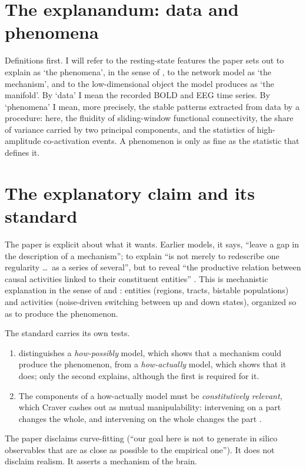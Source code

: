 \documentclass[11pt]{article}
\begin{document}
\section{The explanandum: data and phenomena}
Definitions first. I will refer to the resting-state features the paper sets out to explain as `the phenomena', in the sense of \textcite{bogen1988}, to the network model as `the mechanism', and to the low-dimensional object the model produces as `the manifold'. By `data' I mean the recorded BOLD and EEG time series. By `phenomena' I mean, more precisely, the stable patterns extracted from data by a procedure: here, the fluidity of sliding-window functional connectivity, the share of variance carried by two principal components, and the statistics of high-amplitude co-activation events. A phenomenon is only as fine as the statistic that defines it.


\section{The explanatory claim and its standard}
The paper is explicit about what it wants. Earlier models, it says, ``leave a gap in the description of a mechanism''; to explain ``is not merely to redescribe one regularity \ldots\ as a series of several'', but to reveal ``the productive relation between causal activities linked to their constituent entities'' \parencite[Introduction]{fousek2024}. This is mechanistic explanation in the sense of \textcite{mdc2000} and \textcite{craver2007}: entities (regions, tracts, bistable populations) and activities (noise-driven switching between up and down states), organized so as to produce the phenomenon.

The standard carries its own tests.
\begin{enumerate}
\item \textcite{craver2006} distinguishes a \emph{how-possibly} model, which shows that a mechanism could produce the phenomenon, from a \emph{how-actually} model, which shows that it does; only the second explains, although the first is required for it.
\item The components of a how-actually model must be \emph{constitutively relevant}, which Craver cashes out as mutual manipulability: intervening on a part changes the whole, and intervening on the whole changes the part \parencite{craver2007}.
\end{enumerate}
The paper disclaims curve-fitting (``our goal here is not to generate in silico observables that are as close as possible to the empirical one''). It does not disclaim realism. It asserts a mechanism of the brain.
\end{document}
